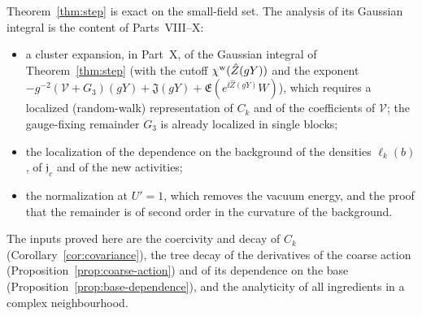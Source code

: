 \begin{remark}\label{x:34.11}
Theorem~\ref{thm:step} is exact on the small-field set. The analysis of its Gaussian integral is the content of Parts~VIII--X:
\begin{itemize}
\item a cluster expansion, in Part~X, of the Gaussian integral of Theorem~\ref{thm:step} (with the cutoff $\chi^{\rm w}(\hat Z(gY))$ and the exponent $-g^{-2}(\mathcal V+G_3)(gY)+\mathfrak J(gY)+\mathfrak E(e^{\ii\hat Z(gY)}W)$), which requires a localized (random-walk) representation of $C_k$ and of the coefficients of $\mathcal V$; the gauge-fixing remainder $G_3$ is already localized in single blocks;
\item the localization of the dependence on the background of the densities $\ell_k(b)$, of $\mathfrak j_c$ and of the new activities;
\item the normalization at $U'=1$, which removes the vacuum energy, and the proof that the remainder is of second order in the curvature of the background.
\end{itemize}
The inputs proved here are the coercivity and decay of $C_k$ (Corollary~\ref{cor:covariance}), the tree decay of the derivatives of the coarse action (Proposition~\ref{prop:coarse-action}) and of its dependence on the base (Proposition~\ref{prop:base-dependence}), and the analyticity of all ingredients in a complex neighbourhood.
\end{remark}
